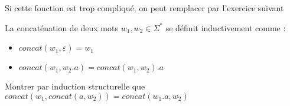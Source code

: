\begin{com}
	Si cette fonction est trop compliqué, on peut remplacer par l'exercice suivant
	\begin{definition}
		La concaténation de deux mots $w_1, w_2 \in \Sigma^*$ se définit inductivement comme : \begin{itemize}
			\item $concat(w_1, \varepsilon) = w_1$
			\item $concat(w_1, w_2.a) = concat(w_1, w_2).a$
		\end{itemize}
	\end{definition}
	
	\begin{exercise}
		Montrer par induction structurelle que $concat(w_1, concat(a, w_2)) = concat(w_1.a, w_2)$ 
	\end{exercise}
\end{com}